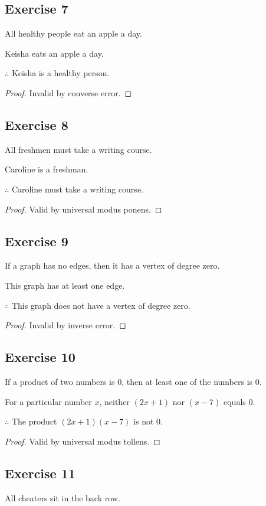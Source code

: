 \documentclass[14pt]{extarticle}
\begin{document}
\subsection{Exercise 7}
All healthy people eat an apple a day.

Keisha eats an apple a day.

$\therefore$ Keisha is a healthy person.

\begin{proof}
Invalid by converse error.
\end{proof}

\subsection{Exercise 8}
All freshmen must take a writing course.

Caroline is a freshman.

$\therefore$ Caroline must take a writing course.

\begin{proof}
Valid by universal modus ponens.
\end{proof}

\subsection{Exercise 9}
If a graph has no edges, then it has a vertex of degree zero.

This graph has at least one edge.

$\therefore$ This graph does not have a vertex of degree zero.

\begin{proof}
Invalid by inverse error.
\end{proof}

\subsection{Exercise 10}
If a product of two numbers is 0, then at least one of the numbers is 0.

For a particular number $x$, neither $(2x + 1)$ nor $(x - 7)$ equals 0.

$\therefore$ The product $(2x + 1)(x - 7)$ is not 0.

\begin{proof}
Valid by universal modus tollens.
\end{proof}

\subsection{Exercise 11}
All cheaters sit in the back row. 
\end{document}
